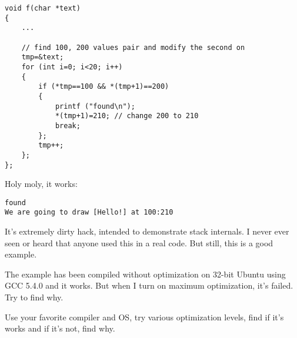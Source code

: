 \begin{lstlisting}[style=customc]
void f(char *text)
{
	...

	// find 100, 200 values pair and modify the second on
	tmp=&text;
	for (int i=0; i<20; i++)
	{
		if (*tmp==100 && *(tmp+1)==200)
		{
			printf ("found\n");
			*(tmp+1)=210; // change 200 to 210
			break;
		};
		tmp++;
	};
};
\end{lstlisting}

Holy moly, it works:

\begin{lstlisting}
found
We are going to draw [Hello!] at 100:210
\end{lstlisting}


It's extremely dirty hack, intended to demonstrate stack internals.
I never ever seen or heard that anyone used this in a real code.
But still, this is a good example.

\myparagraph{\Exercise}

The example has been compiled without optimization on 32-bit Ubuntu using GCC 5.4.0 and it works.
But when I turn on  maximum optimization, it's failed.
Try to find why.

Use your favorite compiler and OS, try various optimization levels, find if it's works and if it's not, find why.

